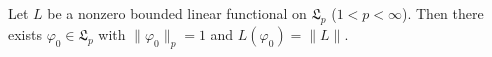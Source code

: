 Let $L$ be a nonzero bounded linear functional on $\mathfrak{L}_p$ ($1 < p < \infty$). Then there exists $\varphi_0 \in \mathfrak{L}_p$ with $\|\varphi_0\|_p = 1$ and $L(\varphi_0) = \|L\|$.
